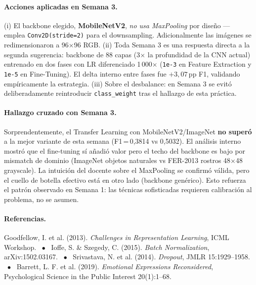 \documentclass[10pt,a4paper,twocolumn]{article}
\begin{document}
\paragraph{Acciones aplicadas en Semana 3.} (i) El backbone elegido, \textbf{MobileNetV2}, \textit{no usa MaxPooling} por diseño — emplea \texttt{Conv2D(stride=2)} para el downsampling. Adicionalmente las imágenes se redimensionaron a 96$\times$96 RGB. (ii) Toda Semana 3 es una respuesta directa a la segunda sugerencia: backbone de 88 capas (3$\times$ la profundidad de la CNN actual) entrenado en dos fases con LR diferenciado 1\,000$\times$ (\texttt{1e-3} en Feature Extraction y \texttt{1e-5} en Fine-Tuning). El delta interno entre fases fue $+3{,}07$\,pp F1, validando empíricamente la estrategia. (iii) Sobre el desbalance: en Semana 3 se evitó deliberadamente reintroducir \texttt{class\_weight} tras el hallazgo de esta práctica.

\paragraph{Hallazgo cruzado con Semana 3.} Sorprendentemente, el Transfer Learning con MobileNetV2/ImageNet \textbf{no superó} a la mejor variante de esta semana (F1\,=\,0,3814 vs 0,5032). El análisis interno mostró que el fine-tuning sí añadió valor pero el techo del backbone es bajo por mismatch de dominio (ImageNet objetos naturales vs FER-2013 rostros 48$\times$48 grayscale). La intuición del docente sobre el MaxPooling se confirmó válida, pero el cuello de botella efectivo está en otro lado (backbone genérico). Esto refuerza el patrón observado en Semana 1: las técnicas sofisticadas requieren calibración al problema, no se asumen.

\paragraph{Referencias.}
{\footnotesize
Goodfellow, I. et al. (2013). \textit{Challenges in Representation Learning}, ICML Workshop. ~$\bullet$~
Ioffe, S. \& Szegedy, C. (2015). \textit{Batch Normalization}, arXiv:1502.03167. ~$\bullet$~
Srivastava, N. et al. (2014). \textit{Dropout}, JMLR 15:1929--1958. ~$\bullet$~
Barrett, L. F. et al. (2019). \textit{Emotional Expressions Reconsidered}, Psychological Science in the Public Interest 20(1):1--68.
}
\end{document}
